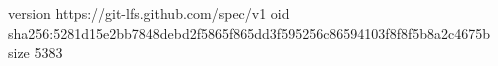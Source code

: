 version https://git-lfs.github.com/spec/v1
oid sha256:5281d15e2bb7848debd2f5865f865dd3f595256c86594103f8f8f5b8a2c4675b
size 5383
